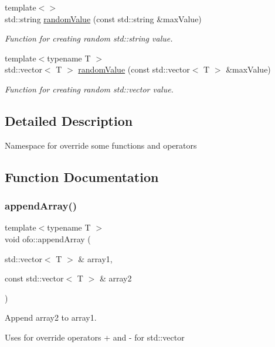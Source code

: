 \begin{DoxyCompactItemize}
{\footnotesize template$<$$>$ }\\std\+::string \mbox{\hyperlink{namespaceofo_ab6b4775595276351b6c5485fa99649b3}{random\+Value}} (const std\+::string \&max\+Value)
\begin{DoxyCompactList}\small\item\em Function for creating random std\+::string value. \end{DoxyCompactList}\item 
{\footnotesize template$<$typename T $>$ }\\std\+::vector$<$ T $>$ \mbox{\hyperlink{namespaceofo_aeded67ad2a0018cf9fb55c1697c4ae87}{random\+Value}} (const std\+::vector$<$ T $>$ \&max\+Value)
\begin{DoxyCompactList}\small\item\em Function for creating random std\+::vector value. \end{DoxyCompactList}\end{DoxyCompactItemize}


\subsection{Detailed Description}
Namespace for override some functions and operators 

\subsection{Function Documentation}
\mbox{\label{namespaceofo_af902ceadcbee96b115f72c248d935cd8}} 
\subsubsection{\texorpdfstring{append\+Array()}{appendArray()}}
{\footnotesize\ttfamily template$<$typename T $>$ \\
void ofo\+::append\+Array (\begin{DoxyParamCaption}\item[{std\+::vector$<$ T $>$ \&}]{array1,  }\item[{const std\+::vector$<$ T $>$ \&}]{array2 }\end{DoxyParamCaption})}



Append array2 to array1. 

Uses for override operators \textquotesingle{}+\textquotesingle{} and \textquotesingle{}-\/\textquotesingle{} for std\+::vector

